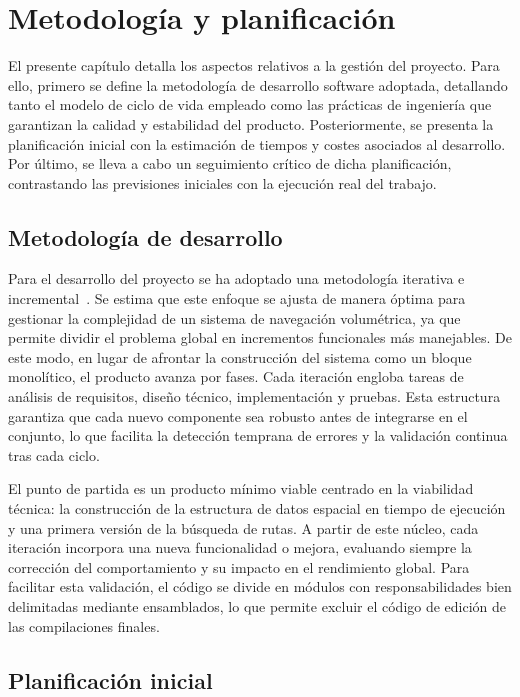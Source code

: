 \chapter{Metodología y planificación}

El presente capítulo detalla los aspectos relativos a la gestión del proyecto.
Para ello, primero se define la metodología de desarrollo software adoptada, detallando tanto el modelo de ciclo de vida empleado como las prácticas de ingeniería que garantizan la calidad y estabilidad del producto.
Posteriormente, se presenta la planificación inicial con la estimación de tiempos y costes asociados al desarrollo.
Por último, se lleva a cabo un seguimiento crítico de dicha planificación, contrastando las previsiones iniciales con la ejecución real del trabajo.

\section{Metodología de desarrollo}
\label{sec:metodologiadesarrollo}

Para el desarrollo del proyecto se ha adoptado una metodología iterativa e incremental~\cite{pressman2010ingenieria}.
Se estima que este enfoque se ajusta de manera óptima para gestionar la complejidad de un sistema de navegación volumétrica, ya que permite dividir el problema global en incrementos funcionales más manejables.
De este modo, en lugar de afrontar la construcción del sistema como un bloque monolítico, el producto avanza por fases.
Cada iteración engloba tareas de análisis de requisitos, diseño técnico, implementación y pruebas.
Esta estructura garantiza que cada nuevo componente sea robusto antes de integrarse en el conjunto, lo que facilita la detección temprana de errores y la validación continua tras cada ciclo.

El punto de partida es un producto mínimo viable centrado en la viabilidad técnica: la construcción de la estructura de datos espacial en tiempo de ejecución y una primera versión de la búsqueda de rutas.
A partir de este núcleo, cada iteración incorpora una nueva funcionalidad o mejora, evaluando siempre la corrección del comportamiento y su impacto en el rendimiento global.
Para facilitar esta validación, el código se divide en módulos con responsabilidades bien delimitadas mediante ensamblados, lo que permite excluir el código de edición de las compilaciones finales.

\section{Planificación inicial}
\label{sec:planificacioninicial}

